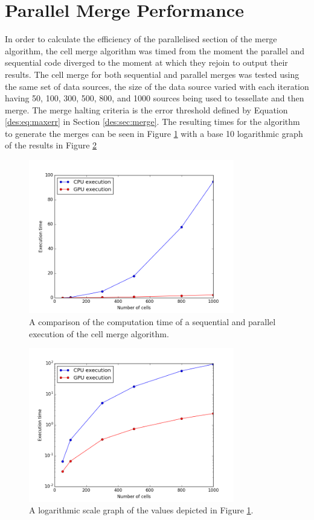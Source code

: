 \section{Parallel Merge Performance}
In order to calculate the efficiency of the parallelised section of the merge algorithm, the cell merge algorithm was timed from the moment the parallel and sequential code diverged to the moment at which they rejoin to output their results. The cell merge for both sequential and parallel merges was tested using the same set of data sources, the size of the data source varied with each iteration having 50, 100, 300, 500, 800, and 1000 sources being used to tessellate and then merge. The merge halting criteria is the error threshold defined by Equation \ref{des:eq:maxerr} in Section \ref{des:sec:merge}. The resulting times for the algorithm to generate the merges can be seen in Figure \ref{res:fig:cvg} with a base 10 logarithmic graph of the results in Figure \ref{res:fig:cvg_1og}
\begin{figure}[H]
\centering
\includegraphics[width=0.8\textwidth]{Images/result_cvg.png}
\caption{A comparison of the computation time of a sequential and parallel execution of the cell merge algorithm.}
\label{res:fig:cvg}
\end{figure}
\begin{figure}[H]
\centering
\includegraphics[width=0.8\textwidth]{Images/result_cvg_log.png}
\caption{A logarithmic scale graph of the values depicted in Figure \ref{res:fig:cvg}.}
\label{res:fig:cvg_1og}
\end{figure}

